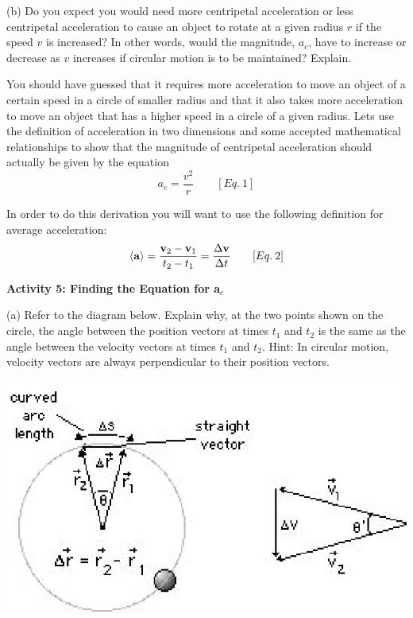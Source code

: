 (b) Do you expect you would need more centripetal acceleration or less centripetal
acceleration to cause an object to rotate at a given radius $r$ if the speed 
$v$
is increased? In other words, would the magnitude, \( a_{c} \), have to increase
or decrease as $v$ increases if circular motion is to be maintained? Explain.
\vspace{20mm}

You should have guessed that it requires more acceleration to move an object
of a certain speed in a circle of smaller radius and that it also takes more
acceleration to move an object that has a higher speed in a circle of a given
radius. Lets use the definition of acceleration in two dimensions and some accepted
mathematical relationships to show that the magnitude of centripetal acceleration
should actually be given by the equation
\[
a_{c}=\frac{v^{2}}{r}\qquad [Eq.\: 1]\]


In order to do this derivation you will want to use the following definition
for average acceleration:
\[
\left\langle {\bf a}\right\rangle =\frac{{{\bf v}_{2}}-{{\bf v}_{1}}}
{t_{2}-t_{1}}=\frac{\Delta {\bf v}}{\Delta t}\qquad [Eq.\: 2]\]


\textbf{Activity 5: Finding the Equation for a\( _{c} \) }

(a) Refer to the diagram below. Explain why, at the two points shown on the
circle, the angle between the position vectors at times \( t_{1} \) and \( t_{2} \)
is the same as the angle between the velocity vectors at times \( t_{1} \)
and \( t_{2} \). Hint: In circular motion, velocity vectors are always perpendicular
to their position vectors.

\vspace{0.3cm}
{\par\raggedright \includegraphics{circ_motion/circ_motion_fig3.eps} \par}
\vspace{0.3cm}

